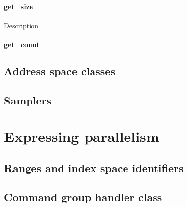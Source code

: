 \documentclass[letterpaper,10pt,english]{sphinxmanual}
\begin{document}
\paragraph{get\_size}
\label{\detokenize{programming-interface/data/accessor:get-size}}
\begin{sphinxVerbatim}[commandchars=\\\{\}]
  
\end{sphinxVerbatim}

Description


\paragraph{get\_count}
\label{\detokenize{programming-interface/data/accessor:get-count}}

\subsection{Address space classes}
\label{\detokenize{programming-interface/data/address-space:address-space-classes}}\label{\detokenize{programming-interface/data/address-space::doc}}

\subsection{Samplers}
\label{\detokenize{programming-interface/data/sampler:samplers}}\label{\detokenize{programming-interface/data/sampler::doc}}

\section{Expressing parallelism}
\label{\detokenize{programming-interface/index:expressing-parallelism}}

\subsection{Ranges and index space identifiers}
\label{\detokenize{programming-interface/parallelism/range:ranges-and-index-space-identifiers}}\label{\detokenize{programming-interface/parallelism/range::doc}}

\subsection{Command group handler class}
\label{\detokenize{programming-interface/parallelism/command-group:command-group-handler-class}}\label{\detokenize{programming-interface/parallelism/command-group::doc}}
\end{document}
